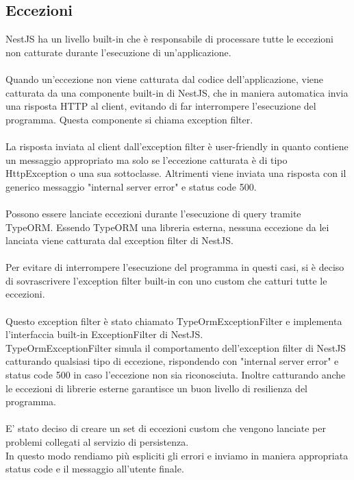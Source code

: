 \subsection{Eccezioni}
NestJS ha un livello built-in che è responsabile di processare tutte le eccezioni non catturate durante 
l'esecuzione di un'applicazione.
\\\\
Quando un'eccezione non viene catturata dal codice dell'applicazione, viene catturata da una componente built-in di NestJS, che
 in maniera automatica invia una risposta \gls{HTTP} al client, evitando di far interrompere 
l'esecuzione del programma. Questa componente si chiama exception filter.
\\\\
La risposta inviata al client dall'exception filter è user-friendly in quanto contiene un messaggio appropriato ma
 solo se l'eccezione catturata è di tipo HttpException o 
una sua sottoclasse. 
Altrimenti viene inviata una risposta con il generico messaggio "internal server error" e status code 500.
\\\\
Possono essere lanciate eccezioni durante l'esecuzione di query tramite TypeORM. Essendo TypeORM una libreria
esterna, nessuna eccezione da lei lanciata viene catturata dal exception filter di NestJS.
\\\\
Per evitare di interrompere l'esecuzione del programma in questi casi,
 si è deciso di 
sovrascrivere l'exception filter built-in con uno custom che catturi tutte le eccezioni. 
\\\\
Questo exception filter è stato chiamato TypeOrmExceptionFilter e implementa l'interfaccia built-in ExceptionFilter 
di NestJS. 
\\
TypeOrmExceptionFilter simula il comportamento dell'exception filter di NestJS catturando qualsiasi
tipo di eccezione, rispondendo con "internal server error" e status code 500 in caso l'eccezione non sia riconosciuta.
Inoltre catturando anche le eccezioni di librerie esterne garantisce un buon livello di resilienza
del programma. 
\\\\
E' stato deciso di creare un set di eccezioni
custom che vengono lanciate per problemi collegati al servizio di persistenza.
\\
In questo modo rendiamo più espliciti gli errori e inviamo in maniera appropriata status code e il messaggio 
all'utente finale.
